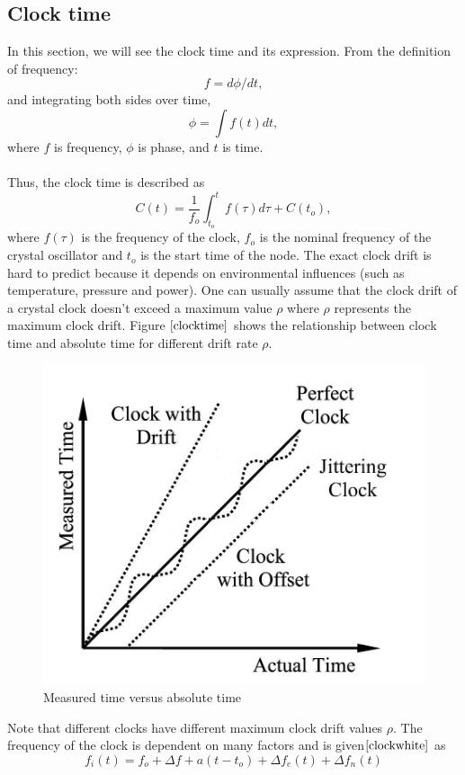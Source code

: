 \documentclass[a4paper,10pt]{report}
\begin{document}
\subsection{\textbf{Clock time}}
In this section, we will see the clock time and its expression. From the definition of frequency:
\begin{equation}
f = d\phi/dt \label{freq_defn} ,
\end{equation}
and integrating both sides over time,
 \begin{equation}
\phi =\int f(t)dt ,
 \end{equation}
where $f$ is frequency, $\phi$ is phase, and $t$ is time.\paragraph*{}
Thus, the clock time is described as
\begin{equation}
C(t) = \frac{1}{f_o}\int_{t_o}^{t} {f(\tau)d\tau} + C(t_o) ,
\label{clock}
\end{equation}
where $f(\tau)$ is the frequency of the clock, $f_o$ is the nominal frequency of the crystal oscillator and $t_o$ is the start time of
the node. The exact clock drift is hard to predict because it depends on environmental influences (such as temperature, pressure
and power). One can usually assume that the clock drift of a crystal clock doesn't exceed a maximum value $\rho$ where $\rho$ represents the maximum clock drift. Figure $\ref{clocktime}$ shows the relationship between clock time and absolute time for different drift rate $\rho$.
\begin{figure}
\centering
\includegraphics[width=0.4 \textwidth]{actualvsmeasuredtime}
\caption{Measured time versus absolute time} \label{clocktime}
\end{figure}
Note that different clocks have different maximum clock drift values
$\rho$. The frequency of the clock is dependent on many factors and is given$\cite{clockwhite}$ as
\begin{equation}
f_i(t) = f_o + \Delta f + a(t-t_o) + \Delta f_e(t) + \Delta f_n(t)
\label{frequency}
\end{equation}
\end{document}
